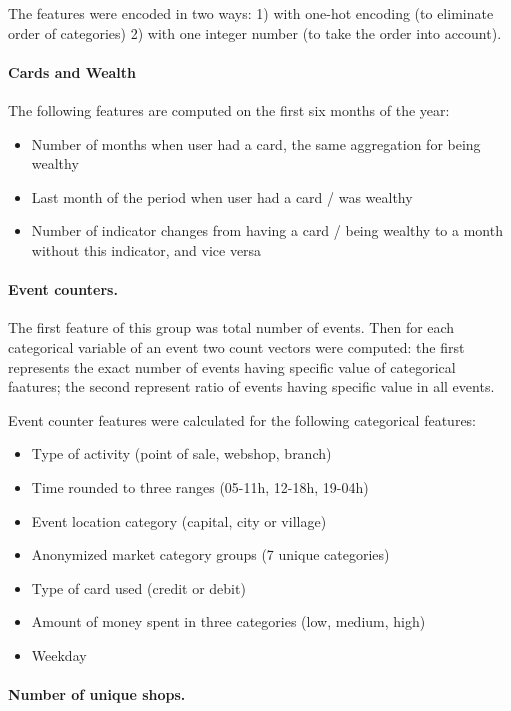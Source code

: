 \documentclass{llncs}
\begin{document}
The features were encoded in two ways: 1) with one-hot encoding (to eliminate order of categories) 2) with one integer number (to take the order into account).

\paragraph{Cards and Wealth}

The following features are computed on the first six months of the year:
\begin{itemize}
	\item Number of months when user had a card, the same aggregation for being wealthy
	\item Last month of the period when user had a card / was wealthy
	\item Number of indicator changes from having a card / being wealthy to a month without this 
indicator, and vice versa
\end{itemize}

\paragraph{Event counters.}

The first feature of this group was total number of events. Then for each categorical variable of an event two count vectors were computed: the first represents the exact number of events having specific value of categorical faatures; the second represent ratio of events having specific value in all events. 

Event counter features were calculated for the following categorical features:
\begin{itemize}
	\item Type of activity (point of sale, webshop, branch)
	\item Time rounded to three ranges (05-11h, 12-18h, 19-04h)
	\item Event location category (capital, city or village)
	\item Anonymized market category groups (7 unique categories)
	\item Type of card used (credit or debit)
	\item Amount of money spent in three categories (low, medium, high)
	\item Weekday
\end{itemize}

\paragraph{Number of unique shops.}
\end{document}

